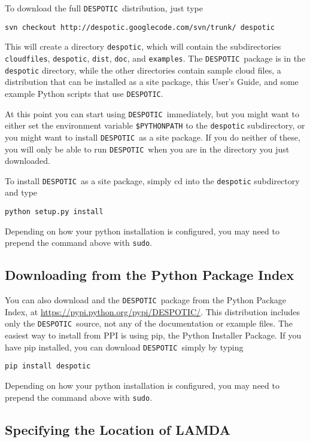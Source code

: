 \documentclass[12pt]{article}
\newcommand{\despotic}{\texttt{DESPOTIC}}
\begin{document}
To download the full \despotic\ distribution, just type

\begin{verbatim}
svn checkout http://despotic.googlecode.com/svn/trunk/ despotic
\end{verbatim}

This will create a directory \verb=despotic=, which will contain the subdirectories \verb=cloudfiles=, \verb=despotic=, \verb=dist=, \verb=doc=, and \verb=examples=. The \despotic\ package is in the \verb=despotic= directory, while the other directories contain sample cloud files, a distribution that can be installed as a site package, this User's Guide, and some example Python scripts that use \despotic.

At this point you can start using \despotic\ immediately, but you might want to either set the environment variable \verb=$PYTHONPATH= to the \verb=despotic= subdirectory, or you might want to install \despotic\ as a site package. If you do neither of these, you will only be able to run \despotic\ when you are in the directory you just downloaded.

To install \despotic\ as a site package, simply cd into the \verb=despotic= subdirectory and type
\begin{verbatim}
python setup.py install
\end{verbatim}
Depending on how your python installation is configured, you may need to prepend the command above with \verb=sudo=.

\subsection{Downloading from the Python Package Index}

You can also download and the \despotic\ package from the Python Package Index, at \url{https://pypi.python.org/pypi/DESPOTIC/}. This distribution includes only the \despotic\ source, not any of the documentation or example files. The easiest way to install from PPI is using pip, the Python Installer Package. If you have pip installed, you can download \despotic\ simply by typing
\begin{verbatim}
pip install despotic
\end{verbatim}
Depending on how your python installation is configured, you may need to prepend the command above with \verb=sudo=.


\subsection{Specifying the Location of LAMDA}
\end{document}
